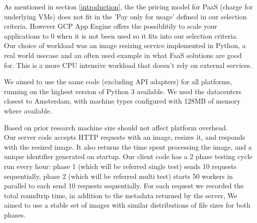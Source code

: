 \documentclass[11pt]{article}
\begin{document}
As mentioned in section \ref{introduction}, the the pricing model for PaaS (charge for underlying VMs) does not fit in the 'Pay only for usage' defined in our selection criteria. However GCP App Engine offers the possiblitily to scale your applications to 0 when it is not been used so it fits into our selection criteria. \\

Our choice of workload was an image resizing service implemented in Python, a real world \cite{ii}
usecase and an often used example in what FaaS solutions are good for.
This is a more CPU intensive workload that
doesn't rely on external services.

We aimed to use the same code (excluding API adapters) for all platforms, running on the highest version of Python 3 available.
We used the datacenters closest to Amsterdam,
with machine types configured with 128MB of memory where available.


Based on prior research %
machine size should not affect platform overhead. \\

Our server code accepts HTTP requests with an image,
resizes it, and responds with the resized image.
It also returns the time spent processing the image,
and a unique identifier generated on startup.
Our client code has a 2 phase testing cycle run every hour:
phase 1 (which will be referred single test) sends 10 requests sequentially,
phase 2 (which will be referred multi test) starts 50 workers in parallel to each send 10 requests sequentially.
For each request we recorded the total roundtrip time,
in addition to the metadata returned by the server,
We aimed to use a stable set of images with similar distributions
of file sizes for both phases.
\end{document}

